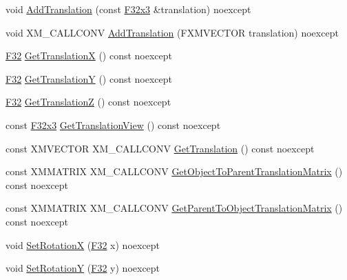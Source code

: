 \begin{DoxyCompactItemize}
\item 
void \mbox{\hyperlink{classmage_1_1_s1_e_t_transform3_d_ad916c781783e222e8ef963f8ceff4b99}{Add\+Translation}} (const \mbox{\hyperlink{namespacemage_a1e3c7a882af461f161caa1cbddaf1fa2}{F32x3}} \&translation) noexcept
\item 
void X\+M\+\_\+\+C\+A\+L\+L\+C\+O\+NV \mbox{\hyperlink{classmage_1_1_s1_e_t_transform3_d_a3111eb30105391f51e417e81d36abc01}{Add\+Translation}} (F\+X\+M\+V\+E\+C\+T\+OR translation) noexcept
\item 
\mbox{\hyperlink{namespacemage_aa97e833b45f06d60a0a9c4fc22ae02c0}{F32}} \mbox{\hyperlink{classmage_1_1_s1_e_t_transform3_d_abba6f982423e10eace0718dfee916000}{Get\+TranslationX}} () const noexcept
\item 
\mbox{\hyperlink{namespacemage_aa97e833b45f06d60a0a9c4fc22ae02c0}{F32}} \mbox{\hyperlink{classmage_1_1_s1_e_t_transform3_d_ade8e64e1aade03448dd31ae9757bd1eb}{Get\+TranslationY}} () const noexcept
\item 
\mbox{\hyperlink{namespacemage_aa97e833b45f06d60a0a9c4fc22ae02c0}{F32}} \mbox{\hyperlink{classmage_1_1_s1_e_t_transform3_d_a9d56558b29933a1e5d731fcb07e774ac}{Get\+TranslationZ}} () const noexcept
\item 
const \mbox{\hyperlink{namespacemage_a1e3c7a882af461f161caa1cbddaf1fa2}{F32x3}} \mbox{\hyperlink{classmage_1_1_s1_e_t_transform3_d_aa4b6b72bedef3ff20f56ad5309869b15}{Get\+Translation\+View}} () const noexcept
\item 
const X\+M\+V\+E\+C\+T\+OR X\+M\+\_\+\+C\+A\+L\+L\+C\+O\+NV \mbox{\hyperlink{classmage_1_1_s1_e_t_transform3_d_aa944acb8dc7ae0f5b3b204a02a964059}{Get\+Translation}} () const noexcept
\item 
const X\+M\+M\+A\+T\+R\+IX X\+M\+\_\+\+C\+A\+L\+L\+C\+O\+NV \mbox{\hyperlink{classmage_1_1_s1_e_t_transform3_d_ae98a3577ae358d1de8f2cb4635742362}{Get\+Object\+To\+Parent\+Translation\+Matrix}} () const noexcept
\item 
const X\+M\+M\+A\+T\+R\+IX X\+M\+\_\+\+C\+A\+L\+L\+C\+O\+NV \mbox{\hyperlink{classmage_1_1_s1_e_t_transform3_d_aeb2aecdb694891ca063052874d79971b}{Get\+Parent\+To\+Object\+Translation\+Matrix}} () const noexcept
\item 
void \mbox{\hyperlink{classmage_1_1_s1_e_t_transform3_d_a562a0ec6bdd26c21a05c7d11d74cb5f7}{Set\+RotationX}} (\mbox{\hyperlink{namespacemage_aa97e833b45f06d60a0a9c4fc22ae02c0}{F32}} x) noexcept
\item 
void \mbox{\hyperlink{classmage_1_1_s1_e_t_transform3_d_ae9db2c1cf01ed618376679cf1cdb5e56}{Set\+RotationY}} (\mbox{\hyperlink{namespacemage_aa97e833b45f06d60a0a9c4fc22ae02c0}{F32}} y) noexcept

\end{DoxyCompactItemize}
